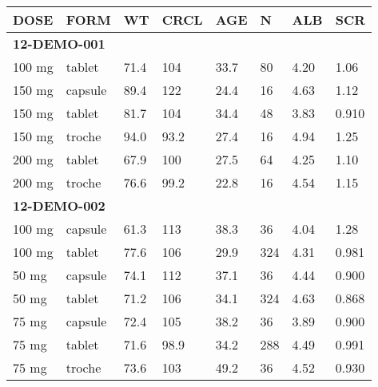{\def\arraystretch{1.4}\tabcolsep=5pt
\begin{threeparttable}
\begin{tabular}[h]{llllllll}
\hline
DOSE & FORM & WT & CRCL & AGE & N & ALB & SCR \\
\hline
\multicolumn{8}{l}{\textbf{12-DEMO-001}}\\
100 mg & tablet & 71.4 & 104 & 33.7 & 80 & 4.20 & 1.06 \\
150 mg & capsule & 89.4 & 122 & 24.4 & 16 & 4.63 & 1.12 \\
150 mg & tablet & 81.7 & 104 & 34.4 & 48 & 3.83 & 0.910 \\
150 mg & troche & 94.0 & 93.2 & 27.4 & 16 & 4.94 & 1.25 \\
200 mg & tablet & 67.9 & 100 & 27.5 & 64 & 4.25 & 1.10 \\
200 mg & troche & 76.6 & 99.2 & 22.8 & 16 & 4.54 & 1.15 \\
\hline \multicolumn{8}{l}{\textbf{12-DEMO-002}}\\
100 mg & capsule & 61.3 & 113 & 38.3 & 36 & 4.04 & 1.28 \\
100 mg & tablet & 77.6 & 106 & 29.9 & 324 & 4.31 & 0.981 \\
50 mg & capsule & 74.1 & 112 & 37.1 & 36 & 4.44 & 0.900 \\
50 mg & tablet & 71.2 & 106 & 34.1 & 324 & 4.63 & 0.868 \\
75 mg & capsule & 72.4 & 105 & 38.2 & 36 & 3.89 & 0.900 \\
75 mg & tablet & 71.6 & 98.9 & 34.2 & 288 & 4.49 & 0.991 \\
75 mg & troche & 73.6 & 103 & 49.2 & 36 & 4.52 & 0.930 \\
\hline
\end{tabular}
\end{threeparttable}
}
